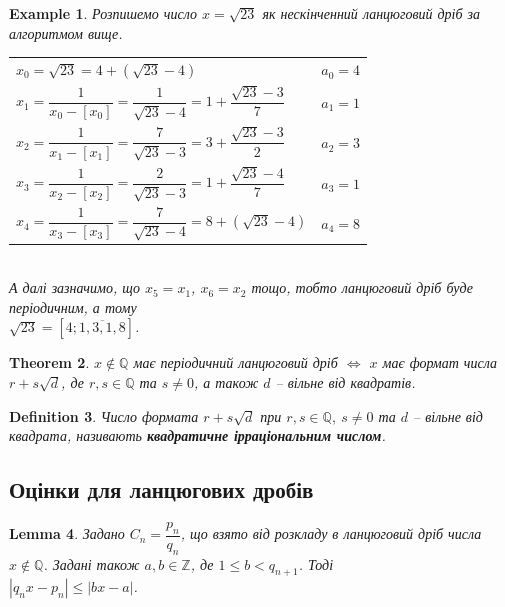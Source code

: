 \documentclass[a4paper, 10pt]{article}
\theoremstyle{theoremdd}
\newtheorem{theorem}{Theorem}[subsection]
\theoremstyle{theoremdd}
\newtheorem{definition}[theorem]{Definition}
\theoremstyle{theoremdd}
\theoremstyle{theoremdd}
\newtheorem{example}[theorem]{Example}
\theoremstyle{theoremdd}
\theoremstyle{theoremdd}
\theoremstyle{theoremdd}
\newtheorem{lemma}[theorem]{Lemma}
\theoremstyle{theoremdd}
\begin{document}
\begin{example}
Розпишемо число $x = \sqrt{23}$ як нескінченний ланцюговий дріб за алгоритмом вище.\\
\begin{tabular}{ll}
$x_0 = \sqrt{23} = 4 + (\sqrt{23}-4)$ & $a_0 = 4$ \\
$x_1 = \dfrac{1}{x_0-[x_0]} = \dfrac{1}{\sqrt{23} - 4} = 1 + \dfrac{\sqrt{23} - 3}{7}$ & $a_1 = 1$\\
$x_2 = \dfrac{1}{x_1-[x_1]} = \dfrac{7}{\sqrt{23}-3} = 3 + \dfrac{\sqrt{23}-3}{2}$ & $a_2 = 3$\\
$x_3 = \dfrac{1}{x_2-[x_2]} = \dfrac{2}{\sqrt{23}-3} = 1 + \dfrac{\sqrt{23}-4}{7}$ & $a_3 = 1$\\
$x_4 = \dfrac{1}{x_3 - [x_3]} = \dfrac{7}{\sqrt{23} - 4} = 8 + (\sqrt{23}-4)$ & $a_4 = 8$
\end{tabular}\\
А далі зазначимо, що $x_5 = x_1$, $x_6 = x_2$ тощо, тобто ланцюговий дріб буде періодичним, а тому\\
$\sqrt{23} = [4;\overline{1,3,1,8}]$.
\end{example}

\begin{theorem}
$x \not\in \mathbb{Q}$ має періодичний ланцюговий дріб $\iff$ $x$ має формат числа $r + s\sqrt{d}$, де $r,s \in \mathbb{Q}$ та $s \neq 0$, а також $d$ -- вільне від квадратів.
\end{theorem}

\begin{definition}
Число формата $r + s \sqrt{d}$ при $r,s \in \mathbb{Q},\ s \neq 0$ та $d$ -- вільне від квадрата, називають \textbf{квадратичне ірраціональним числом}.
\end{definition}

\subsection{Оцінки для ланцюгових дробів}
\begin{lemma}
Задано $C_n = \dfrac{p_n}{q_n}$, що взято від розкладу в ланцюговий дріб числа $x \not\in \mathbb{Q}$. Задані також $a,b \in \mathbb{Z}$, де $1 \leq b < q_{n+1}$. Тоді \\ $|q_nx - p_n| \leq |bx-a|$.
\end{lemma}
\end{document}
